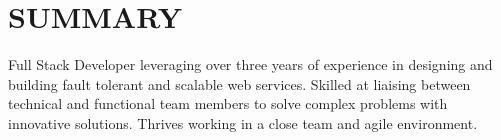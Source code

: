 \documentclass[]{deedy-resume-openfont}
\begin{document}
%
%

%
%



\vspace{5mm}

%
%

\section{SUMMARY}
\begin{flushleft}
Full Stack Developer leveraging over three years of experience in designing and building fault tolerant and scalable web services. Skilled at liaising between technical and functional team members to solve complex problems with innovative solutions. Thrives working in a close team and agile environment.
\end{flushleft}
\vspace*{-3mm}
\end{document}

